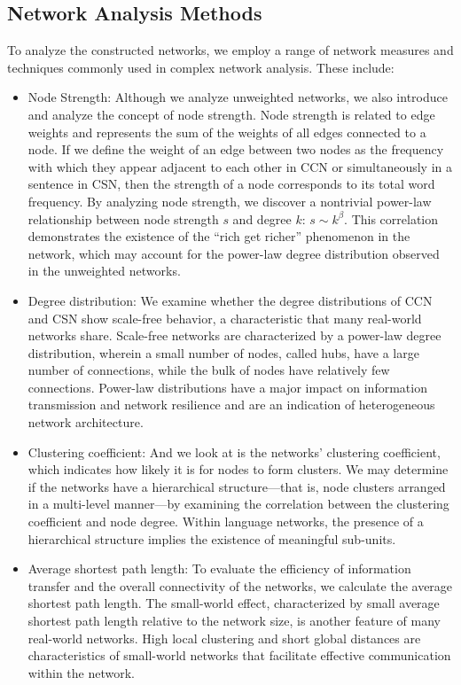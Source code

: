\documentclass[11pt]{article}
\begin{document}
\subsection{Network Analysis Methods}
To analyze the constructed networks, we employ a range of network measures and techniques commonly used in complex network analysis. These include:

\begin{itemize}
    \item Node Strength: Although we analyze unweighted networks, we also introduce and analyze the concept of node strength. Node strength is related to edge weights and represents the sum of the weights of all edges connected to a node. If we define the weight of an edge between two nodes as the frequency with which they appear adjacent to each other in CCN or simultaneously in a sentence in CSN, then the strength of a node corresponds to its total word frequency.
    By analyzing node strength, we discover a nontrivial power-law relationship between node strength $s$ and degree $k$: $s \sim k^{\beta}$. This correlation demonstrates the existence of the ``rich get richer'' phenomenon in the network, which may account for the power-law degree distribution observed in the unweighted networks. 
    \item Degree distribution: We examine whether the degree distributions of CCN and CSN show scale-free behavior, a characteristic that many real-world networks share. Scale-free networks are characterized by a power-law degree distribution, wherein a small number of nodes, called hubs, have a large number of connections, while the bulk of nodes have relatively few connections. Power-law distributions have a major impact on information transmission and network resilience and are an indication of heterogeneous network architecture.
    \item Clustering coefficient: And we look at is the networks' clustering coefficient, which indicates how likely it is for nodes to form clusters. We may determine if the networks have a hierarchical structure—that is, node clusters arranged in a multi-level manner—by examining the correlation between the clustering coefficient and node degree. Within language networks, the presence of a hierarchical structure implies the existence of meaningful sub-units.
    \item Average shortest path length: To evaluate the efficiency of information transfer and the overall connectivity of the networks, we calculate the average shortest path length. The small-world effect, characterized by small average shortest path length relative to the network size, is another feature of many real-world networks. High local clustering and short global distances are characteristics of small-world networks that facilitate effective communication within the network.

\end{itemize}
\end{document}
